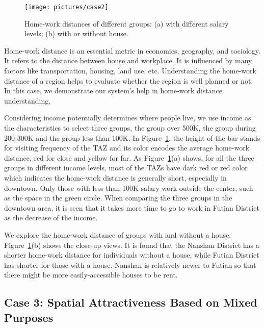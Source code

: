 \begin{figure}[htb!]
 \centering %
 \texttt{[image: pictures/case2]}
 \caption{Home-work distances of different groups: (a) with different salary levels; (b) with or without house.}
 \label{case2}
\end{figure}


Home-work distance is an essential metric in economics, geography, and sociology. It refers to the distance between house and workplace. It is influenced by many factors like transportation, housing, land use, etc. Understanding the home-work distance of a region helps to evaluate whether the region is well planned or not. In this case, we demonstrate our system's help in home-work distance understanding.

Considering income potentially determines where people live, we use income as the characteristics to select three groups, the group over 500K, the group during 200-300K and the group less than 100K. In Figure~\ref{case2}, the height of the bar stands for visiting frequency of the TAZ and its color encodes the average home-work distance, red for close and yellow for far. As Figure~\ref{case2}(a) shows, for all the three groups in different income levels, most of the TAZs have dark red or red color which indicates the home-work distance is generally short, especially in downtown. Only those with less than 100K salary work outside the center, such as the space in the green circle. When comparing the three groups in the downtown area, it is seen that it takes more time to go to work in Futian District as the decrease of the income.

We explore the home-work distance of groups with and without a house.
Figure~\ref{case2}(b) shows the close-up views. It is found that the Nanshan District has a shorter home-work distance for individuals without a house, while Futian District has shorter for those with a house. Nanshan is relatively newer to Futian so that there might be more easily-accessible houses to be rent.



\subsection{Case 3: Spatial Attractiveness Based on Mixed Purposes}

